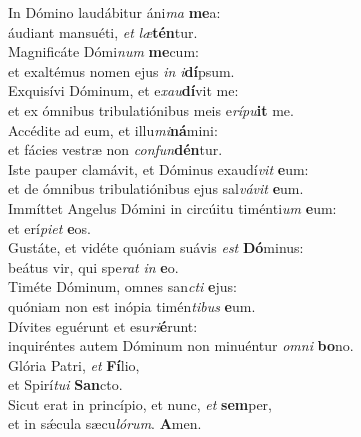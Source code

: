 \evenverse In Dómino laudábitur áni\textit{ma} \textbf{me}a:~\*\\
\evenverse áudiant mansuéti, \textit{et} \textit{læ}\textbf{tén}tur.\\
\oddverse Magnificáte Dómi\textit{num} \textbf{me}cum:~\*\\
\oddverse et exaltémus nomen ejus \textit{in} \textit{i}\textbf{dí}psum.\\
\evenverse Exquisívi Dóminum, et e\textit{xau}\textbf{dí}vit me:~\*\\
\evenverse et ex ómnibus tribulatiónibus meis e\textit{rí}\textit{pu}\textbf{it} me.\\
\oddverse Accédite ad eum, et illu\textit{mi}\textbf{ná}mini:~\*\\
\oddverse et fácies vestræ non \textit{con}\textit{fun}\textbf{dén}tur.\\
\evenverse Iste pauper clamávit, et Dóminus exaudí\textit{vit} \textbf{e}um:~\*\\
\evenverse et de ómnibus tribulatiónibus ejus sal\textit{vá}\textit{vit} \textbf{e}um.\\
\oddverse Immíttet Angelus Dómini in circúitu timénti\textit{um} \textbf{e}um:~\*\\
\oddverse et erí\textit{pi}\textit{et} \textbf{e}os.\\
\evenverse Gustáte, et vidéte quóniam suávis \textit{est} \textbf{Dó}minus:~\*\\
\evenverse beátus vir, qui spe\textit{rat} \textit{in} \textbf{e}o.\\
\oddverse Timéte Dóminum, omnes san\textit{cti} \textbf{e}jus:~\*\\
\oddverse quóniam non est inópia timén\textit{ti}\textit{bus} \textbf{e}um.\\
\evenverse Dívites eguérunt et esu\textit{ri}\textbf{é}runt:~\*\\
\evenverse inquiréntes autem Dóminum non minuéntur \textit{om}\textit{ni} \textbf{bo}no.\\
\oddverse Glória Patri, \textit{et} \textbf{Fí}lio,~\*\\
\oddverse et Spirí\textit{tu}\textit{i} \textbf{San}cto.\\
\evenverse Sicut erat in princípio, et nunc, \textit{et} \textbf{sem}per,~\*\\
\evenverse et in sǽcula sæcu\textit{ló}\textit{rum}. \textbf{A}men.\\
